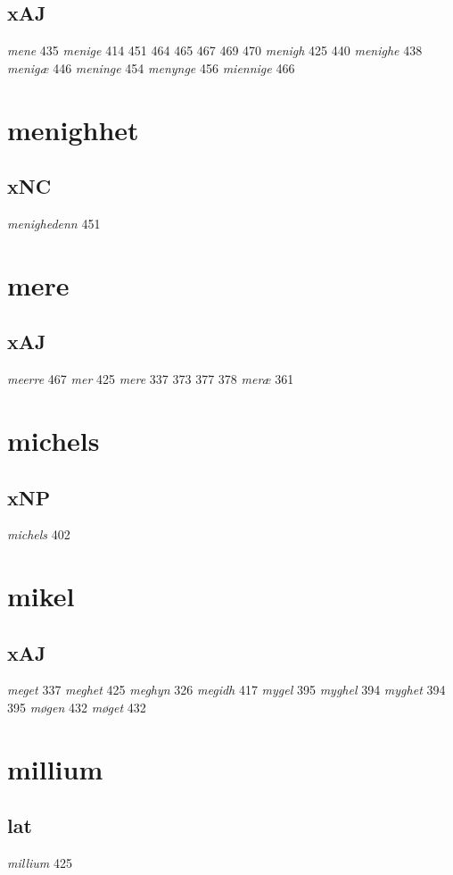 \documentclass[a4paper,twocolumn]{article}
\begin{document}
\subsection{xAJ}
\label{sec:org299f5f0}
\emph{mene} 435 \emph{menige} 414 451 464 465 467 469 470 \emph{menigh} 425 440 \emph{menighe} 438 \emph{menigæ} 446 \emph{meninge} 454 \emph{menynge} 456 \emph{miennige} 466 
\section{menighhet}
\label{sec:org69be5cf}
\subsection{xNC}
\label{sec:org93b81b3}
\emph{menighedenn} 451 
\section{mere}
\label{sec:org9380773}
\subsection{xAJ}
\label{sec:org936c13c}
\emph{meerre} 467 \emph{mer} 425 \emph{mere} 337 373 377 378 \emph{meræ} 361 
\section{michels}
\label{sec:org606aa40}
\subsection{xNP}
\label{sec:orgb59e449}
\emph{michels} 402 
\section{mikel}
\label{sec:org7bca5fb}
\subsection{xAJ}
\label{sec:orge981c5a}
\emph{meget} 337 \emph{meghet} 425 \emph{meghyn} 326 \emph{megidh} 417 \emph{mygel} 395 \emph{myghel} 394 \emph{myghet} 394 395 \emph{møgen} 432 \emph{møget} 432 
\section{millium}
\label{sec:org18548a5}
\subsection{lat}
\label{sec:org4f2c080}
\emph{millium} 425 
\end{document}

